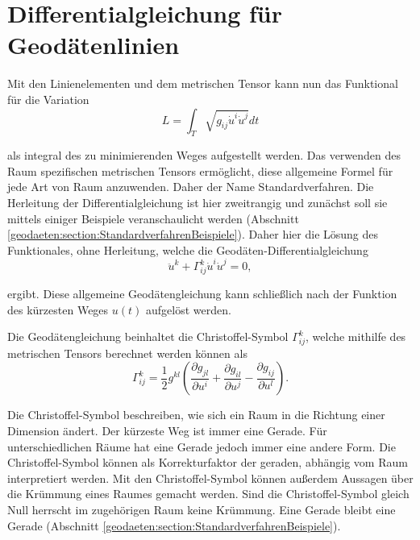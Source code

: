 %
%
%
%
\section{Differentialgleichung für Geodätenlinien
\label{geodaeten:section:Standardverfahren}}

Mit den Linienelementen und dem metrischen Tensor kann nun das Funktional für die Variation
\begin{equation}
	L = \int_T \sqrt{g_{ij} \dot{u}^i \dot{u}^j} dt
\end{equation}

als integral des zu minimierenden Weges aufgestellt werden.
Das verwenden des Raum spezifischen metrischen Tensors ermöglicht, diese allgemeine Formel für jede Art von Raum anzuwenden.
Daher der Name Standardverfahren.
Die Herleitung der Differentialgleichung ist hier zweitrangig und zunächst soll sie mittels einiger Beispiele veranschaulicht werden (Abschnitt \ref{geodaeten:section:StandardverfahrenBeispiele}).
Daher hier die Lösung des Funktionales, ohne Herleitung, welche die Geodäten-Differentialgleichung
\begin{equation}
	\ddot{u}^k + \Gamma_{ij}^k \dot{u}^i \dot{u}^j = 0 ,
	\label{geodaeten:equation:Standardverfahren:Geodaetengleichung}
\end{equation}

ergibt.
Diese allgemeine Geodätengleichung kann schließlich nach der Funktion des kürzesten Weges $u(t)$ aufgelöst werden.

Die Geodätengleichung beinhaltet die Christoffel-Symbol $\Gamma_{ij}^k$, welche mithilfe des metrischen Tensors berechnet werden können als
\begin{equation}
	\Gamma_{ij}^k = \frac{1}{2} g^{kl} \left( \frac{\partial g_{jl}}{\partial u^i} + \frac{\partial g_{il}}{\partial u^j} - \frac{\partial g_{ij}}{\partial u^l} \right) .
	\label{geodaeten:equation:Standardverfahren:Christoffel-Symbol}
\end{equation}

Die Christoffel-Symbol beschreiben, wie sich ein Raum in die Richtung einer Dimension ändert.
Der kürzeste Weg ist immer eine Gerade.
Für unterschiedlichen Räume hat eine Gerade jedoch immer eine andere Form.
Die Christoffel-Symbol können als Korrekturfaktor der geraden, abhängig vom Raum interpretiert werden.
Mit den Christoffel-Symbol können außerdem Aussagen über die Krümmung eines Raumes gemacht werden.
Sind die Christoffel-Symbol gleich Null herrscht im zugehörigen Raum keine Krümmung. 
Eine Gerade bleibt eine Gerade (Abschnitt \ref{geodaeten:section:StandardverfahrenBeispiele}).

